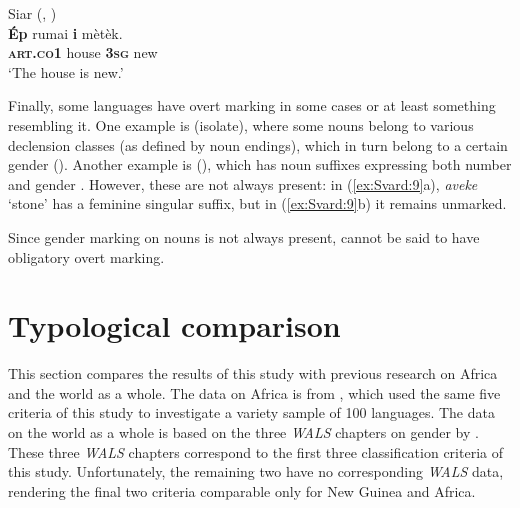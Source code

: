 \documentclass[output=collectionpaper]{langsci/langscibook}
\begin{document}
\ea
\label{ex:Svard:8}
Siar (, ) \citep[206]{Frowein2011}\\
\gll \textbf{Ép} rumai \textbf{i} mètèk.\\
     \textsc{\textbf{art.co1}} house \textsc{\textbf{3sg}} new\\
\glt `The house is new.'
\z


Finally, some languages have overt marking in some cases or at least something resembling it. One example is  (isolate), where some nouns belong to various declension classes (as defined by noun endings), which in turn belong to a certain gender (\citealt[176]{Lindstroem2002}). Another example is  (), which has noun suffixes expressing both number and gender \citep[41]{Robinson2011}. However, these are not always present: in (\ref{ex:Svard:9}a), \textit{aveke} `stone' has a feminine singular suffix, but in (\ref{ex:Svard:9}b) it remains unmarked.

%

Since gender marking on nouns is not always present,  cannot be said to have obligatory overt marking.

\section{Typological comparison}
\label{sec:Svard:4}

This section compares the results of this study with previous research on Africa and the world as a whole. The data on Africa is from \citet{DiGarbo2014}, which used the same five criteria of this study to investigate a variety sample of 100 languages. The data on the world as a whole is based on the three \textit{WALS} chapters on gender by  \citet{Corbett2013,Corbett2013a,Corbett2013b}. These three \textit{WALS} chapters correspond to the first three classification criteria of this study. Unfortunately, the remaining two have no corresponding \textit{WALS} data, rendering the final two criteria comparable only for New Guinea and Africa.
\end{document}
